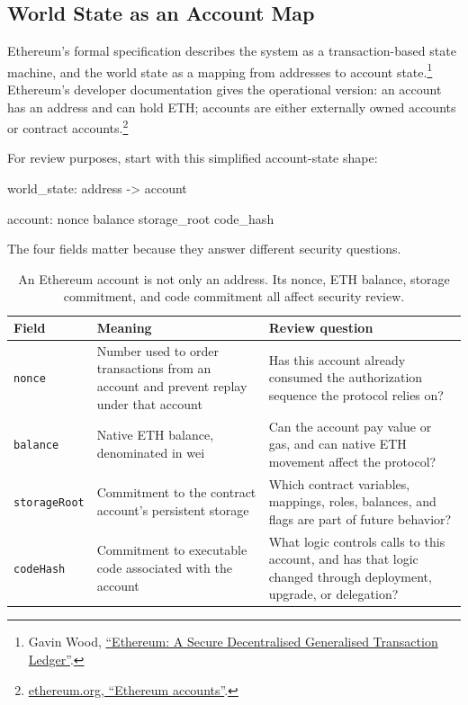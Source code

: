 \subsection{World State as an Account Map}

Ethereum's formal specification describes the system as a transaction-based state machine, and the world state as a mapping from addresses to account state.\footnote{Gavin Wood, \href{https://ethereum.github.io/yellowpaper/paper.pdf}{``Ethereum: A Secure Decentralised Generalised Transaction Ledger''}.} Ethereum's developer documentation gives the operational version: an account has an address and can hold ETH; accounts are either externally owned accounts or contract accounts.\footnote{\href{https://ethereum.org/developers/docs/accounts/}{ethereum.org, ``Ethereum accounts''}.}

For review purposes, start with this simplified account-state shape:

\begin{codeblock}
world_state:
    address -> account

account:
    nonce
    balance
    storage_root
    code_hash
\end{codeblock}

The four fields matter because they answer different security questions.

\begin{table}[htbp]
\centering
\small
\renewcommand{\arraystretch}{1.18}
\begin{tabularx}{\textwidth}{@{}>{\RaggedRight\arraybackslash}p{}>{\RaggedRight\arraybackslash}p{}X@{}}
\toprule
Field & Meaning & Review question \\
\midrule
\texttt{nonce} & Number used to order transactions from an account and prevent replay under that account & Has this account already consumed the authorization sequence the protocol relies on? \\
\texttt{balance} & Native ETH balance, denominated in wei & Can the account pay value or gas, and can native ETH movement affect the protocol? \\
\texttt{storageRoot} & Commitment to the contract account's persistent storage & Which contract variables, mappings, roles, balances, and flags are part of future behavior? \\
\texttt{codeHash} & Commitment to executable code associated with the account & What logic controls calls to this account, and has that logic changed through deployment, upgrade, or delegation? \\
\bottomrule
\end{tabularx}
\caption{An Ethereum account is not only an address. Its nonce, ETH balance, storage commitment, and code commitment all affect security review.}
\end{table}

